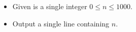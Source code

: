 \newcommand{\maxn}{1000}

\begin{frame}
    \frametitle{\problemtitle}

    \begin{itemize}
        \item Given is a single integer $0\leq n\leq \maxn$.
        \item Output a single line containing $n$.
    \end{itemize}
\end{frame}
